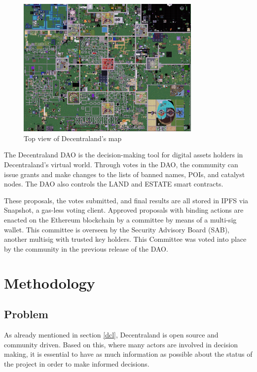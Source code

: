 \documentclass[MSE,Master,english]{twbook}%
\begin{document}
\begin{figure}[H]
  \centering
  \includegraphics[width=0.8\textwidth]{dcl_map.png}
  \caption{Top view of Decentraland's map \cite{genesisCity}}
  \label{fig:dcl_map}
\end{figure}

The Decentraland DAO\cite{DCLDAO} is the decision-making tool for digital assets holders in Decentraland's virtual world. Through votes in the DAO, the community can issue grants and make changes to the lists of banned names, POIs, and catalyst nodes. The DAO also controls the \gls{LAND} and \gls{ESTATE} smart contracts.

These proposals, the votes submitted, and final results are all stored in IPFS via Snapshot, a gas-less voting client. Approved proposals with binding actions are enacted on the Ethereum blockchain by a committee by means of a multi-sig wallet. This committee is overseen by the Security Advisory Board (SAB), another multisig with trusted key holders. This Committee was voted into place by the community in the previous release of the DAO.

\chapter{Methodology}
\section{Problem}
As already mentioned in section \ref{dcl}, Decentraland is open source and community driven. Based on this, where many actors are involved in decision making, it is essential to have as much information as possible about the status of the project in order to make informed decisions.
\end{document}
